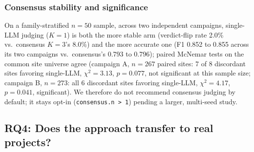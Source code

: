 \documentclass[a4paper]{llncs}
\begin{document}
\subsubsection{Consensus stability and significance}
\label{sec:eval-consensus}

On a family-stratified $n{=}50$ sample, across two independent
campaigns, single-LLM judging ($K{=}1$) is both the more stable arm
(verdict-flip rate 2.0\% vs.\ consensus $K{=}3$'s 8.0\%) and the more
accurate one (F1 0.852 to 0.855 across its two campaigns vs.\
consensus's 0.793 to 0.796); paired McNemar tests on the common site
universe agree (campaign A, $n{=}267$ paired sites: 7 of 8 discordant
sites favoring single-LLM, $\chi^2 = 3.13$, $p = 0.077$, not
significant at this sample size; campaign B, $n{=}273$: all 6
discordant sites favoring single-LLM, $\chi^2 = 4.17$, $p = 0.041$,
significant).
We
therefore do not recommend consensus judging by default; it
stays opt-in
(\texttt{consensus.n~>~1}) pending a larger, multi-seed study.

\noindent{}

\subsection{RQ4: Does the approach transfer to real projects?}
\label{sec:eval-lamed}
\end{document}
